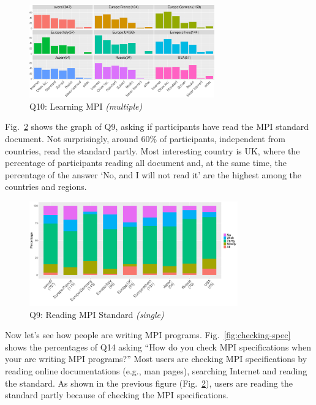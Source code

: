 \documentclass[conference,10pt,letterpaper]{IEEEtran}
\def\myquote#1{`#1'}
\begin{document}
\begin{figure}[htb]
\begin{center}
\includegraphics[width=8cm]{R-scripts/Q10.pdf}
\caption{Q10: Learning MPI {\it(multiple)}}
\label{fig:learning-mpi}
\end{center}
\end{figure}

Fig.~\ref{fig:reading-standard} shows the graph of Q9, asking if
participants have read the MPI standard document. Not surprisingly,
around 60\% of participants, independent from countries, read the
standard partly. Most interesting country is UK, where the percentage
of participants reading all document and, at the same time, the
percentage of the answer \myquote{No, and I will not read it} are the
highest among the countries and regions. 

\begin{figure}[htb]
\begin{center}
\includegraphics[width=9cm]{R-scripts/Q9.pdf}
\caption{Q9: Reading MPI Standard {\it(single)}}
\label{fig:reading-standard}
\end{center}
\end{figure}

Now let's see how people are writing MPI
programs. Fig.~\ref{fig:checking-spec} shows the percentages of Q14
asking ``How do you check MPI specifications when your are writing MPI
programs?'' Most users are checking MPI specifications by reading online
documentations (e.g., man pages), searching Internet and reading the
standard. As shown in the previous figure
(Fig.~\ref{fig:reading-standard}), users are reading the standard
partly because of checking the MPI specifications.
\end{document}
